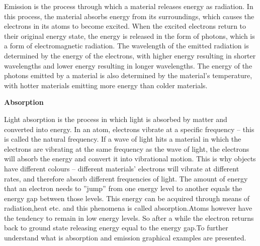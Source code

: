 \documentclass{article}
\begin{document}
{                \hspace{0.5cm}Emission is the process through which a material releases energy as radiation. In this process, the material absorbs energy from its surroundings, which causes the electrons in its atoms to become excited. When the excited electrons return to their original energy state, the energy is released in the form of photons, which is a form of electromagnetic radiation. The wavelength of the emitted radiation is determined by the energy of the electrons, with higher energy resulting in shorter wavelengths and lower energy resulting in longer wavelengths. The energy of the photons emitted by a material is also determined by the material’s temperature, with hotter materials emitting more energy than colder materials.\par
                \vspace*{1\baselineskip}
                
                \textbf{Absorption}
                \vspace*{1\baselineskip}
                
                \hspace{0.5cm}Light absorption is the process in which light is absorbed by matter and converted into energy. In an atom, electrons vibrate at a specific frequency – this is called the natural frequency. If a wave of light hits a material in which the electrons are vibrating at the same frequency as the wave of light, the electrons will absorb the energy and convert it into vibrational motion. This is why objects have different colours – different materials’ electrons will vibrate at different rates, and therefore absorb different frequencies of light. The amount of energy that an electron needs to ”jump” from one energy level to another equals the energy gap between those levels. This energy can be acquired through means of radiation,heat etc. and this phenomena is called absorption.Atoms however have the tendency to remain in low energy levels. So after a while the electron returns back to ground state releasing energy equal to the energy gap.To further understand what is absorption and emission graphical examples are presented.\par  
                
}
\end{document}
